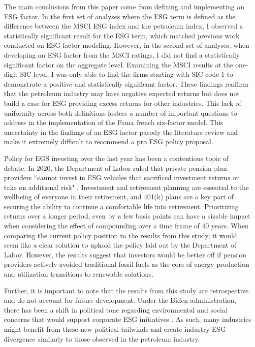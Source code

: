 The main conclusions from this paper come from defining and implementing an ESG factor.  In the first set of analyses where the ESG term is defined as the difference between the MSCI ESG index and the petroleum index, I observed a statistically significant result for the ESG term, which matched previous work conducted on ESG factor modeling. However, in the second set of analyses, when developing an ESG factor from the MSCI ratings, I did not find a statistically significant factor on the aggregate level. Examining the MSCI results at the one-digit SIC level, I was only able to find the firms starting with SIC code  1  to demonstrate a positive and statistically significant factor. These findings reaffirm that the petroleum industry may have negative expected returns but does not build a case for ESG providing excess returns for other industries. This lack of uniformity across both definitions fosters a number of important questions to address in the implementation of the Fama french six-factor model. This uncertainty in the findings of an ESG factor parody the literature review and make it extremely difficult to recommend a pro ESG policy proposal. 

Policy for EGS investing over the last year has been a contentious topic of debate. In 2020, the Department of Labor ruled that private pension plan providers ``cannot invest in ESG vehicles that sacrificed investment returns or take on additional risk" \cite{beals_trump_nodate}. Investment and retirement planning are essential to the wellbeing of everyone in their retirement, and 401(k) plans are a key part of securing the ability to continue a comfortable life into retirement.  Prioritizing returns over a longer period,  even by a few basis points can have a sizable impact when considering the effect of compounding over a time frame of 40 years. When comparing the current policy position to the results from this study, it would seem like a clear solution to uphold the policy laid out by the Department of Labor. However, the results suggest that investors would be better off if pension providers actively avoided traditional fossil fuels as the core of energy production and utilization transitions to renewable solutions. 

Further, it is important to note that the results from this study are retrospective and do not account for future development. Under the Biden administration, there has been a shift in political tone regarding environmental and social concerns that would support corporate ESG initiatives \cite{newburger_heres_2021}. As such, many industries might benefit from these new political tailwinds and create industry ESG divergence similarly to those observed in the petroleum industry. 

